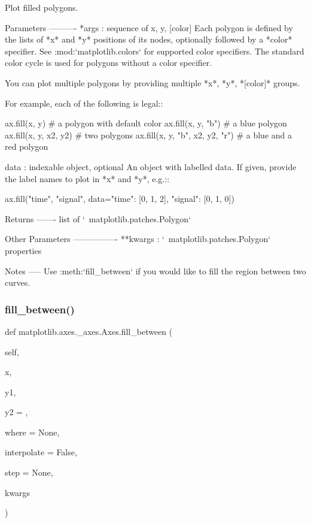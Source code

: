 \begin{DoxyVerb}Plot filled polygons.

Parameters
----------
*args : sequence of x, y, [color]
    Each polygon is defined by the lists of *x* and *y* positions of
    its nodes, optionally followed by a *color* specifier. See
    :mod:`matplotlib.colors` for supported color specifiers. The
    standard color cycle is used for polygons without a color
    specifier.

    You can plot multiple polygons by providing multiple *x*, *y*,
    *[color]* groups.

    For example, each of the following is legal::

ax.fill(x, y)                    # a polygon with default color
ax.fill(x, y, "b")               # a blue polygon
ax.fill(x, y, x2, y2)            # two polygons
ax.fill(x, y, "b", x2, y2, "r")  # a blue and a red polygon

data : indexable object, optional
    An object with labelled data. If given, provide the label names to
    plot in *x* and *y*, e.g.::

ax.fill("time", "signal",
        data={"time": [0, 1, 2], "signal": [0, 1, 0]})

Returns
-------
list of `~matplotlib.patches.Polygon`

Other Parameters
----------------
**kwargs : `~matplotlib.patches.Polygon` properties

Notes
-----
Use :meth:`fill_between` if you would like to fill the region between
two curves.
\end{DoxyVerb}
 \mbox{\label{classmatplotlib_1_1axes_1_1__axes_1_1Axes_a20fb2b3a2ccb7e67d5c96fe9452eb2e0}} 
\subsubsection{\texorpdfstring{fill\+\_\+between()}{fill\_between()}}
{\footnotesize\ttfamily def matplotlib.\+axes.\+\_\+axes.\+Axes.\+fill\+\_\+between (\begin{DoxyParamCaption}\item[{}]{self,  }\item[{}]{x,  }\item[{}]{y1,  }\item[{}]{y2 = {},  }\item[{}]{where = {\ttfamily None},  }\item[{}]{interpolate = {\ttfamily False},  }\item[{}]{step = {\ttfamily None},  }\item[{}]{kwargs }\end{DoxyParamCaption})}

